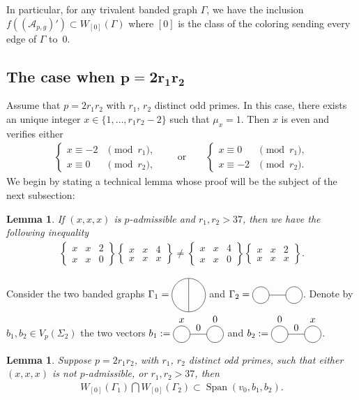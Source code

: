 \documentclass[11pt]{article}
\newcommand{\Span}{\operatorname{Span}}
\newcommand{\eyesgraph}[3]{
\tikz[scale=0.3,baseline=-0.5ex]{
\draw (0,0) circle (1);
\draw (4,0) circle (1);
\draw (1,0) -- (3,0);
\draw (0,1) node[above]{#1};
\draw (2,0) node[above]{#2};
\draw (4,1) node[above]{#3};
}}
\newcommand{\Eyesgraph}{
\tikz[scale=0.3,baseline=-0.5ex]{
\draw (0,0) circle (1);
\draw (4,0) circle (1);
\draw (1,0) -- (3,0);
}
}
\newcommand{\Thetagraph}{
\tikz[scale=0.3,baseline=-0.5ex]{
\draw (0,0) circle (2);
\draw (0,2)--(0,-2);
}
}
\newcommand{\sixj}[6]{
\left\{
\begin{array}{ccc}
#1 & #2 & #3 \\ #4 & #5 & #6
\end{array}
\right\}
}
\newcommand{\muu}[1]{\mu_{#1}}
\numberwithin{equation}{section}
\newtheorem{Lemma}[Theorem]{Lemma}
\begin{document}
In particular, for any trivalent banded graph $\Gamma$, we have the inclusion $ f ( (\mathcal{A}_{p,g})' ) \subset W_{[0]}(\Gamma)$ where $[0]$ is the class of the coloring sending every edge of $\Gamma$ to~$0$.

\setcounter{section}{4}
\setcounter{subsection}{1}
\setcounter{subsubsection}{0}
\setcounter{Theorem}{2}
\setcounter{equation}{1}
\subsection[The case when $p=2r_1r_2$]{The case when $\boldsymbol{p=2r_1r_2}$}

Assume that $p=2r_1r_2$ with $r_1$, $r_2$ distinct odd primes. In this case, there exists an unique integer $x\in \{ 1, \ldots, r_1r_2-2\}$ such that $\muu{x}=1$. Then $x$ is even and verifies either
\begin{gather*}\begin{cases}
x\equiv -2 &\pmod{r_1}, \\
x\equiv 0 & \pmod{r_2},
\end{cases} \qquad \text{or}\qquad \begin{cases}
x\equiv 0 &\pmod{r_1}, \\
x\equiv -2 & \pmod{r_2}.
\end{cases}\end{gather*}
We begin by stating a technical lemma whose proof will be the subject of the next subsection:
\begin{Lemma}\label{GA}
 If $(x,x,x)$ is $p$-admissible and $r_1,r_2>37$, then we have the following inequality
\begin{gather*} \sixj{x}{x}{2}{x}{x}{0} \sixj{x}{x}{4}{x}{x}{x} \neq \sixj{x}{x}{4}{x}{x}{0}\sixj{x}{x}{2}{x}{x}{x}.\end{gather*}
\end{Lemma}

 Consider the two banded graphs $\Gamma_1= \Thetagraph$ and $\Gamma_2=\Eyesgraph$. Denote by $b_1, b_2 \in V_p(\Sigma_2)$ the two vectors $b_1:= \eyesgraph{$x$}{0}{0}$ and $b_2 := \eyesgraph{0}{0}{$x$}$.

\begin{Lemma}\label{lemma_2r1r2}
Suppose $p=2r_1r_2$, with $r_1$, $r_2$ distinct odd primes, such that either $(x,x,x)$ is not $p$-admissible, or $r_1,r_2>37$, then
\begin{gather*} W_{[0]}(\Gamma_1) \bigcap W_{[0]}(\Gamma_2) \subset \Span ( v_0, b_1, b_2 ).\end{gather*}
\end{Lemma}
\end{document}
